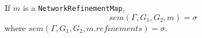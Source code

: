 \documentclass[10pt,fleqn,final]{scrreprt}
\newcommand*{\syntax}[1]{\texttt{#1}}
\newcommand{\semdom}[1]{
\begin{center}
\fbox{$#1$}
\end{center}
}
\newcommand{\current}{\mathit{current}}
\newcommand{\sssclause}[1]{\subsubsection{#1}}
\newenvironment{definitions}[0]{\medskip }{}
\begin{document}
\begin{definitions}
If $m$ is a \syntax{NetworkRefinementMap},
$$sem(\Gamma, G_1,G_2, m) = \sigma$$
\noindent 
where 
$sem(\Gamma,G_1,G_2, m.refinements) = \sigma$.                    



%
%
%
%
%
%
%
%
%

\end{definitions}
\end{document}
